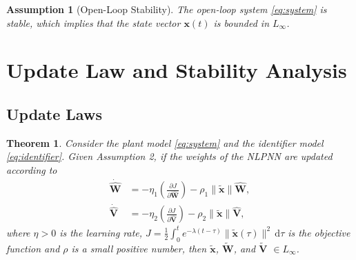 \documentclass[11pt, a4paper]{article}
\newtheorem{theorem}{Theorem}
\newtheorem{assumption}{Assumption}
\newcommand{\ud}{\,\mathrm{d}}
\newcommand{\xtilde}{\tilde{\bm{x}}}
\newcommand{\What}{\hat{\mathbf{W}}}
\newcommand{\Vhat}{\hat{\mathbf{V}}}
\begin{document}
\begin{assumption}[Open-Loop Stability]
The open-loop system \eqref{eq:system} is stable, which implies that the state vector $\bm{x}(t)$ is bounded in $L_\infty$. 
\end{assumption}


\section{Update Law and Stability Analysis}

\subsection{Update Laws}
\begin{theorem}
Consider the plant model \eqref{eq:system} and the identifier model \eqref{eq:identifier}. Given Assumption 2, if the weights of the NLPNN are updated according to
\begin{align}
    \dot{\mathbf{\What}} &= -\eta_1\left(\frac{\partial J}{\partial \hat{\mathbf{W}}}\right) - \rho_1\|\tilde{\bm{x}}\|\hat{\mathbf{W}},\\
    \dot{\mathbf{\Vhat}} &= -\eta_2\left(\frac{\partial J}{\partial \hat{\mathbf{V}}}\right) - \rho_2\|\tilde{\bm{x}}\|\hat{\mathbf{V}},
\end{align}
where $\eta > 0$ is the learning rate, $J = \frac{1}{2} \int_{0}^{t} e^{-\lambda(t-\tau)} \|\xtilde(\tau)\|^2 \ud\tau$ is the objective function and $\rho$ is a small positive number, then $\tilde{\bm{x}}$, $\tilde{\mathbf{W}}$, and $\tilde{\mathbf{V}}$ $\in L_\infty$. 
\end{theorem}
\end{document}
